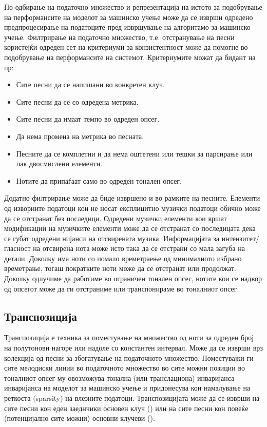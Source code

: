 По одбирање на податочно множество и репрезентација на истото за подобрување на перформансите на моделот за машинско учење може да се изврши одредено предпроцесирање на податоците пред извршување на алгоритамо за машинско учење. Филтрирање на податочно множество, т.е. отстранување на песни користејќи одреден сет на критериуми за конзистентност може да помогне во подобрување на перформансите на системот. Критериумите можат да бидант на пр:
\begin{itemize}
    \item Сите песни да се напишани во конкретен клуч.
    \item Сите песни да се со одредена метрика.
    \item Сите песни да имаат темпо во одреден опсег.
    \item Да нема промена на метрика во песната.
    \item Песните да се комплетни и да нема оштетени или тешки за парсирање или пак двосмислени елементи.
    \item Нотите да припаѓаат само во одреден тонален опсег.
\end{itemize}

Додатно филтрирање може да биде извршено и во рамките на песните. Елементи од изворните податоци кои не носат експлицитно музички податоци обично може да се отстранат без последици. Одредени музички елементи кои вршат модификации на музичките елементи може да се отстранат со последицата дека се губат одредени нијанси на отсвирената музика. Информацијата за интензитет/гласност на отсвирена нота може исто така да се отстрани со мала загуба на детали. Доколку има ноти со помало времетраење од минималното избрано времетрање, тогаш пократките ноти може да се отстранат или продолжат. Доколку одлучиме да работиме во ограничен тонален опсег, нотите кои се надвор од опсегот може да ги отстраниме или транспонираме во тоналниот опсег.

\subsection{Транспозиција}

Транспозиција е техника за поместување на множество од ноти за одреден број на полутонови нагоре или надоле со константен интервал. Може да се изврши врз колекција од песни за збогатување на податочното множество. Поместувајки ги сите мелодиски линии во податочното множество во сите можни позиции во тоналниот опсег му овозможува тонална (или транслациона) инваријанса инваријанса на моделот за машинско учење и придонесува кон намалување на реткоста (sparsity) на влезните податоци. Транспозицијата може да се изврши на сите песни кон еден заеднчики основен клуч (\cite{Sturm2016,Tikhonov2017}) или на сите песни кон повеќе (потенцијално сите можни) основни клучеви (\cite{Yang2017,Bretan2016}).

